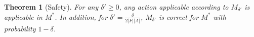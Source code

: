 \documentclass[letterpaper]{article} %
\newtheorem{theorem}{Theorem}
\begin{document}
\begin{theorem}[Safety]\label{thm:sam-safe}
For any $\delta'\geq 0$, any action applicable 
according to $M_{\delta'}$ is applicable in $M^*$. 
In addition, for $\delta'=\frac{\delta}{2|F||A|}$, $M_{\delta'}$ is correct for $M^*$ with probability $1-\delta$. 
\end{theorem}
\end{document}
